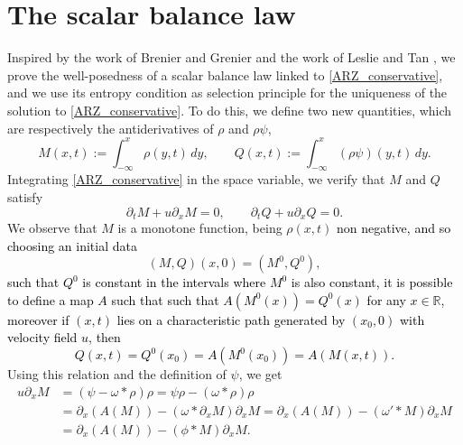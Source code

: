\documentclass[11pt,a4paper,oneside]{amsart}
\newcommand\R{\mathbb{R}}
\begin{document}
\section{The scalar balance law}\label{Sec:3}
\setcounter{equation}{0}
Inspired by the work of Brenier and Grenier \cite{Brenier-Grenier} and the work of Leslie and Tan \cite{Leslie-Tan}, 
we prove the well-posedness of a scalar balance law linked to \eqref{ARZ_conservative}, 
and we use its entropy condition as selection principle for the uniqueness of the solution to \eqref{ARZ_conservative}. 
To do this, we define two new quantities, which are respectively the antiderivatives of $\rho$ and $\rho\psi$,
\begin{equation}\label{def-M-Q}
    M(x,t):=\int_{-\infty}^x \rho(y,t)\,dy,\qquad Q(x,t):=\int_{-\infty}^x (\rho\psi)(y,t)\,dy.
\end{equation}
Integrating \eqref{ARZ_conservative} in the space variable, we verify that $M$ and $Q$ satisfy 
\begin{equation}\label{eq-M-Q}
    \partial_t M+u\partial_xM=0,\qquad \partial_t Q+u\partial_x Q=0.
\end{equation}
We observe that $M$ is a monotone function, being $\rho(x,t)$ \textcolor{black}{non negative,} \textcolor{black}{and so choosing an initial data}
\begin{equation}\label{eq:initial-data-M} 
(M,Q)(x,0)=(M^0, Q^0),
\end{equation}
\textcolor{black}{such that $Q^0$ is constant in the intervals where $M^0$ is also constant, it is possible to define a map $A$ such that
such that $A(M^0(x))=Q^0(x)$ for any $x\in\R$, moreover %
if $(x,t)$ lies on a characteristic path 
generated by $(x_0,0)$ with velocity field $u$, then
\begin{equation*}
    Q(x,t)=Q^0(x_0)=A(M^0(x_0))=A(M(x,t)).
\end{equation*}
}
Using this relation and the definition of $\psi$, we get
\begin{align*}
    u\partial_x M &= (\psi-\omega\ast\rho)\rho=\psi\rho-(\omega\ast\rho)\rho \\
    &=\partial_x(A(M))-(\omega\ast\partial_xM)\partial_xM=\partial_x(A(M))-(\omega'\ast M)\partial_x M \\
    &=\partial_x(A(M))-(\phi\ast M)\partial_x M.
\end{align*}
\end{document}
